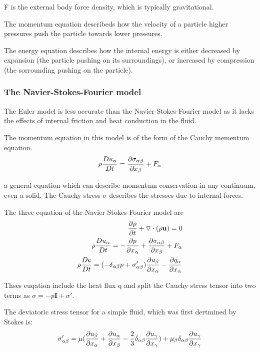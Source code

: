 \documentclass{Note}
\begin{document}
F is the external body force density, which is typically gravitational.

The momentum equation describeds how the velocity of a particle higher pressures push the particle towards lower pressures.

The energy equation describes how the internal energy is either decreased  by expansion (the particle pushing on its surroundings), or increased by compression (the sorrounding pushing on the particle).



\subsubsection{The Navier-Stokes-Fourier model}
The Euler model is less accurate than the Navier-Stokes-Fourier model as it lacks the effects of internal friction and heat conduction in the fluid.

The momentum equation in this model is of the form of the Cauchy mementum equation.
\begin{equation}
\begin{aligned}
\rho{D u_\alpha\over Dt}={\partial \sigma_{\alpha \beta}\over \partial x_\beta}+F_\alpha
\end{aligned}
\end{equation}

a general equation which can describe momentum conservation in any continuum, even a solid. The Cauchy stress $\sigma$ describes the stresses due to internal forces.

The three equation of the Navier-Stokes-Fourier model are
\begin{equation}
\begin{aligned}
{\partial \rho \over \partial t} +\triangledown \cdot (\rho \textbf{u})=0\\
\rho{D u_\alpha\over Dt}=-{\partial p\over \partial x_\alpha}+{\partial \sigma_{\alpha \beta}\over \partial x_\beta}+F_\alpha\\
\rho {De\over Dt}=(-\delta_{\alpha\beta}p +\sigma'_{\alpha\beta}){\partial u_\beta\over \partial x_\alpha}-{\partial q_\alpha\over \partial x_\alpha}
\end{aligned}
\end{equation}

Thses euqation include the heat flux q and split the Cauchy stress tensor into two terms as $\sigma=-p\textbf{I}+\sigma'$. 

The deviatoric stress tensor for a simple fluid, which was first dertmined by Stokes is:
\begin{equation}
\begin{aligned}
\sigma'_{\alpha\beta}=\mu ({\partial u_\beta\over \partial x_\alpha}+{\partial u_\alpha \over \partial x_\beta}-{2\over 3}\delta_{\alpha\beta}{\partial u_\gamma\over \partial x_\gamma})+\mu_\beta\delta_{\alpha\beta}{\partial u_\gamma\over \partial x_\gamma}
\end{aligned}
\end{equation}
\end{document}

